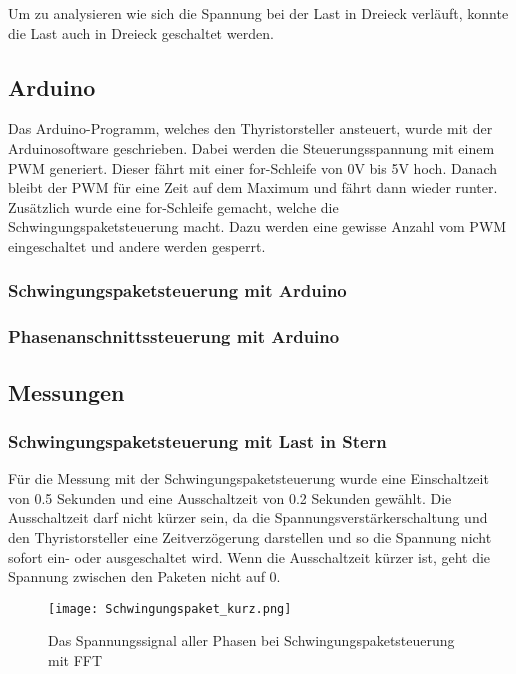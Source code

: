 Um zu analysieren wie sich die Spannung bei der Last in Dreieck verläuft, konnte die Last auch in Dreieck geschaltet werden.


\subsection{Arduino}
Das Arduino-Programm, welches den Thyristorsteller ansteuert, wurde mit der Arduinosoftware geschrieben. Dabei werden die Steuerungsspannung mit einem PWM generiert. Dieser fährt mit einer for-Schleife von 0V bis 5V hoch. Danach bleibt der PWM für eine Zeit auf dem Maximum und fährt dann wieder runter. Zusätzlich wurde eine for-Schleife gemacht, welche die Schwingungspaketsteuerung macht. Dazu werden eine gewisse Anzahl vom PWM eingeschaltet und andere werden gesperrt. 


\subsubsection{Schwingungspaketsteuerung mit Arduino}



\subsubsection{Phasenanschnittssteuerung mit Arduino}

\newpage
\subsection{Messungen}

\subsubsection{Schwingungspaketsteuerung mit Last in Stern}
Für die Messung mit der Schwingungspaketsteuerung wurde eine Einschaltzeit von 0.5 Sekunden und eine Ausschaltzeit von 0.2 Sekunden gewählt. Die Ausschaltzeit darf nicht kürzer sein, da die Spannungsverstärkerschaltung und den Thyristorsteller eine Zeitverzögerung darstellen und so die Spannung nicht sofort ein- oder ausgeschaltet wird. Wenn die Ausschaltzeit kürzer ist, geht die Spannung zwischen den Paketen nicht auf 0. 
\begin{figure}[ht!]
	\centering
	\texttt{[image: Schwingungspaket\_kurz.png]}	
	\caption{Das Spannungssignal aller Phasen bei Schwingungspaketsteuerung mit FFT}\label{fig:Mess_Schwing_kurz}
\end{figure}

